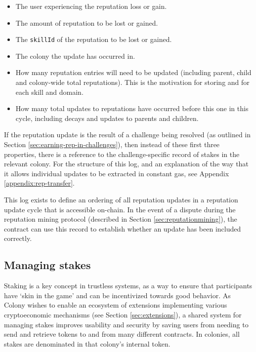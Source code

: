\begin{itemize}
\item The user experiencing the reputation loss or gain.
\item The amount of reputation to be lost or gained.
\item The \texttt{skillId} of the reputation to be lost or gained.
\item The colony the update has occurred in.
\item How many reputation entries will need to be updated (including parent, child and colony-wide total reputations). This is the motivation for storing  and  for each skill and domain.
\item How many total updates to reputations have occurred before this one in this cycle, including decays and updates to parents and children.
\end{itemize}

If the reputation update is the result of a challenge being resolved (as outlined in Section \ref{sec:earning-rep-in-challenges}), then instead of these first three properties, there is a reference to the challenge-specific record of stakes in the relevant colony. For the structure of this log, and an explanation of the way that it allows individual updates to be extracted in constant gas, see Appendix \ref{appendix:rep-transfer}.

This log exists to define an ordering of all reputation updates in a reputation update cycle that is accessible on-chain. In the event of a dispute during the reputation mining protocol (described in Section \ref{sec:reputationmining}), the  contract can use this record to establish whether an update has been included correctly.

\subsection{Managing stakes}\label{sec:stakes}

Staking is a key concept in trustless systems, as a way to ensure that participants have `skin in the game' and can be incentivized towards good behavior. As Colony wishes to enable an ecosystem of extensions implementing various cryptoeconomic mechanisms (see Section \ref{sec:extensions}), a shared system for managing stakes improves usability and security by saving users from needing to send and retrieve tokens to and from many different contracts. In colonies, all stakes are denominated in that colony's internal token.

